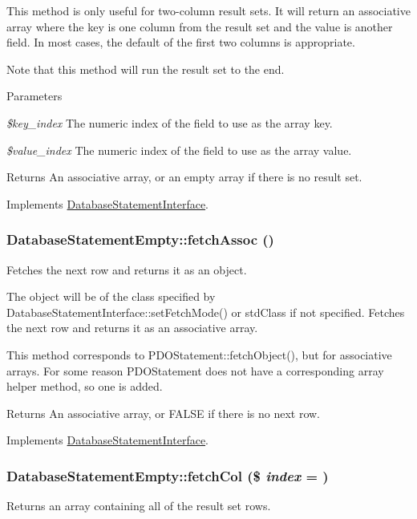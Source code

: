 This method is only useful for two-\/column result sets. It will return an associative array where the key is one column from the result set and the value is another field. In most cases, the default of the first two columns is appropriate.

Note that this method will run the result set to the end.


\begin{DoxyParams}{Parameters}
\item[{\em \$key\_\-index}]The numeric index of the field to use as the array key. \item[{\em \$value\_\-index}]The numeric index of the field to use as the array value.\end{DoxyParams}
\begin{DoxyReturn}{Returns}
An associative array, or an empty array if there is no result set. 
\end{DoxyReturn}


Implements \hyperlink{interfaceDatabaseStatementInterface_a9ffce739d0b144c36fc60b0a7e8a9824}{DatabaseStatementInterface}.\hypertarget{classDatabaseStatementEmpty_a4e3f452f86f9be6c96db961d0e734a37}{
\subsubsection[{fetchAssoc}]{\setlength{\rightskip}{0pt plus 5cm}DatabaseStatementEmpty::fetchAssoc ()}}
\label{classDatabaseStatementEmpty_a4e3f452f86f9be6c96db961d0e734a37}
Fetches the next row and returns it as an object.

The object will be of the class specified by DatabaseStatementInterface::setFetchMode() or stdClass if not specified. Fetches the next row and returns it as an associative array.

This method corresponds to PDOStatement::fetchObject(), but for associative arrays. For some reason PDOStatement does not have a corresponding array helper method, so one is added.

\begin{DoxyReturn}{Returns}
An associative array, or FALSE if there is no next row. 
\end{DoxyReturn}


Implements \hyperlink{interfaceDatabaseStatementInterface_a754f04359c97c0866f5d80e785a24299}{DatabaseStatementInterface}.\hypertarget{classDatabaseStatementEmpty_a51d1a6428d3357315eab407864c08826}{
\subsubsection[{fetchCol}]{\setlength{\rightskip}{0pt plus 5cm}DatabaseStatementEmpty::fetchCol (\$ {\em index} = {})}}
\label{classDatabaseStatementEmpty_a51d1a6428d3357315eab407864c08826}
Returns an array containing all of the result set rows.


